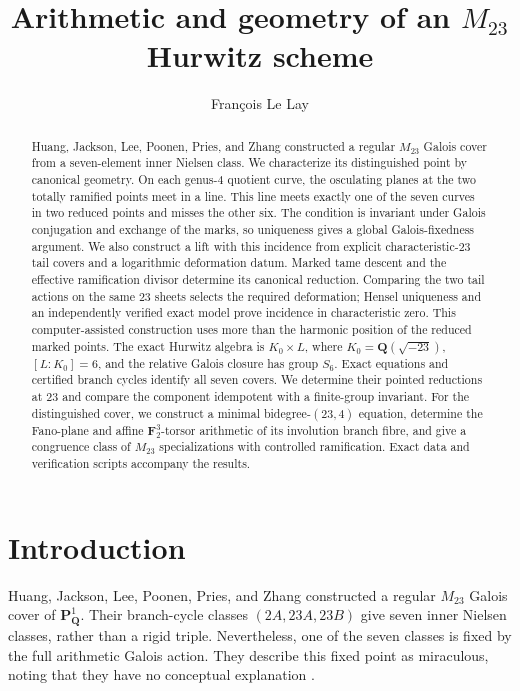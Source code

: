 \documentclass[11pt]{amsart}
\title[Arithmetic and geometry of an $M_{23}$ Hurwitz scheme]
  {Arithmetic and geometry of an $M_{23}$ Hurwitz scheme}
\author{François Le Lay}
\date{}
\theoremstyle{definition}
\theoremstyle{remark}
\newcommand{\QQ}{\mathbf Q}
\newcommand{\FF}{\mathbf F}
\newcommand{\PP}{\mathbf P}
\begin{document}
\begin{abstract}
Huang, Jackson, Lee, Poonen, Pries, and Zhang constructed a regular
$M_{23}$ Galois cover from a seven-element inner Nielsen class.
We characterize its distinguished point by canonical geometry.
On each genus-$4$ quotient curve, the osculating planes at the two
totally ramified points meet in a line.  This line meets exactly one
of the seven curves in two reduced points and misses the other six.
The condition is invariant under Galois conjugation and exchange of
the marks, so uniqueness gives a global Galois-fixedness argument.
We also construct a lift with this incidence from explicit
characteristic-$23$ tail covers and a logarithmic deformation datum.
Marked tame descent and the effective ramification divisor determine
its canonical reduction.  Comparing the two tail actions on the same
$23$ sheets selects the required deformation; Hensel uniqueness and
an independently verified exact model prove incidence in
characteristic zero.  This computer-assisted construction uses more
than the harmonic position of the reduced marked points.
The exact Hurwitz algebra is $K_0\times L$, where
$K_0=\QQ(\sqrt{-23})$, $[L:K_0]=6$, and the relative Galois closure
has group $S_6$.  Exact equations and certified branch cycles identify
all seven covers.  We determine their pointed reductions at $23$
and compare the component idempotent with a finite-group invariant.
For the distinguished cover, we construct a minimal bidegree-$(23,4)$
equation, determine the Fano-plane and affine $\FF_2^3$-torsor
arithmetic of its involution branch fibre, and give a congruence class
of $M_{23}$ specializations with controlled ramification.
Exact data and verification scripts accompany the results.
\end{abstract}

\maketitle

\clearpage
\setcounter{tocdepth}{1}
\tableofcontents

\section{Introduction}

Huang, Jackson, Lee, Poonen, Pries, and Zhang \cite{HJLPPZ} constructed a
regular $M_{23}$ Galois cover of $\PP^1_{\QQ}$.  Their branch-cycle
classes $(2A,23A,23B)$ give seven inner Nielsen classes, rather than a
rigid triple.  Nevertheless, one of the seven classes is fixed by the
full arithmetic Galois action.  They describe this fixed point as
miraculous, noting that they have no conceptual explanation
\cite[Section~1.4]{HJLPPZ}.
\end{document}
